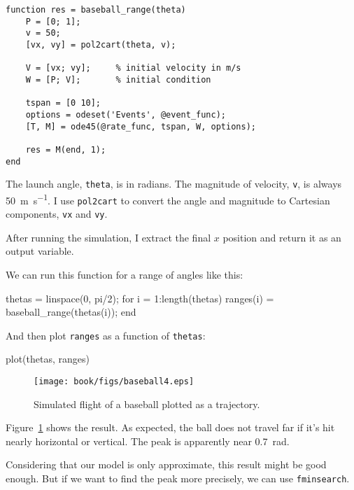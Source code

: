 
\begin{lstlisting}[caption={A function that takes a launch angle of a baseball and returns the distance it travels}, label={lst:baseball_range}]
function res = baseball_range(theta)
    P = [0; 1];       
    v = 50;           
    [vx, vy] = pol2cart(theta, v);
    
    V = [vx; vy];     % initial velocity in m/s
    W = [P; V];       % initial condition
    
    tspan = [0 10];
    options = odeset('Events', @event_func);
    [T, M] = ode45(@rate_func, tspan, W, options);
    
    res = M(end, 1);
end
\end{lstlisting}

The launch angle, {\tt theta}, is in radians.  The magnitude of velocity, {\tt v}, is always \SI{50}{\meter\per\second}.  I use {\tt pol2cart} to convert the angle and magnitude to Cartesian components, {\tt vx} and {\tt vy}.


After running the simulation, I extract the final $x$ position and return it as an output variable.  

We can run this function for a range of angles like this:

\begin{code}
    thetas = linspace(0, pi/2);
    for i = 1:length(thetas)
        ranges(i) = baseball_range(thetas(i));
    end
\end{code}

And then plot {\tt ranges} as a function of {\tt thetas}:

\begin{code}
    plot(thetas, ranges)
\end{code}

\begin{figure}
\centerline{\texttt{[image: book/figs/baseball4.eps]}}
\caption{Simulated flight of a baseball plotted as a trajectory.}
\label{fig:baseball4}
\end{figure}

Figure~\ref{fig:baseball4} shows the result.  As expected, the ball does not travel far if it's hit nearly horizontal or vertical. 
The peak is apparently near \SI{0.7}{\radian}.

Considering that our model is only approximate, this result might be good enough.  But if we want to find the peak more precisely, we can use {\tt fminsearch}.


